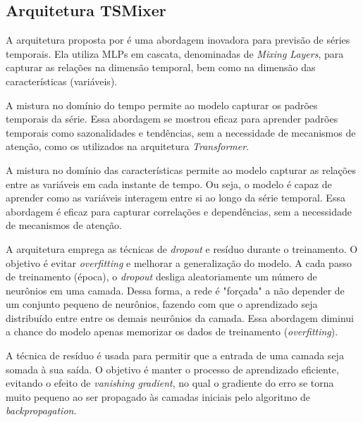 \subsection{Arquitetura TSMixer}
A arquitetura proposta por  é uma abordagem inovadora para previsão de séries temporais. Ela utiliza
MLPs em cascata, denominadas de \textit{Mixing Layers}, para capturar as relações na dimensão temporal, bem como na dimensão das 
características (variáveis).

A mistura no domínio do tempo permite ao modelo capturar os padrões temporais da série. Essa abordagem se mostrou 
eficaz para aprender padrões temporais como sazonalidades e tendências, sem a necessidade de mecanismos de atenção, 
como os utilizados na arquitetura \textit{Transformer}.

A mistura no domínio das características permite ao modelo capturar as relações entre as variáveis em cada instante de tempo.
Ou seja, o modelo é capaz de aprender como as variáveis interagem entre si ao longo da série temporal. Essa abordagem é 
eficaz para capturar correlações e dependências, sem a necessidade de mecanismos de atenção.

A arquitetura emprega as técnicas de \textit{dropout} e resíduo durante o treinamento. O objetivo é evitar \textit{overfitting}
e melhorar a generalização do modelo. A cada passo de treinamento (época), o \textit{dropout} desliga aleatoriamente um
número de neurônios em uma camada. Dessa forma, a rede é "forçada" a não depender de um conjunto pequeno de neurônios,
fazendo com que o aprendizado seja distribuído entre entre os demais neurônios da camada. Essa abordagem diminui a chance
do modelo apenas memorizar os dados de treinamento (\textit{overfitting}).

A técnica de resíduo é usada para permitir que a entrada de uma camada seja somada à sua saída. O objetivo é manter o
processo de aprendizado eficiente, evitando o efeito de \textit{vanishing gradient}, no qual o gradiente do erro se torna
muito pequeno ao ser propagado às camadas iniciais pelo algoritmo de \textit{backpropagation}.

\begin{figure}[!h]
	{}
	{}
\end{figure}

